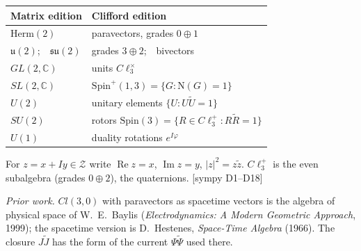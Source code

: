 \documentclass[10pt]{article}
\newcommand{\Cp}{\mathbb{C}}
\newcommand{\Cl}{C\ell_3}
\newcommand{\rv}[1]{\widetilde{#1}}
\newcommand{\N}{\mathrm N}
\newcommand{\Zc}{\mathcal Z}
\newcommand{\Spin}{\mathrm{Spin}}
\newcommand{\tg}[1]{{\scriptsize[#1]}}
\begin{document}
\begin{sheetbox}
{\begin{minipage}[t]{0.46\linewidth}
\begin{tabular}[t]{@{}l l@{}}
\toprule
\textbf{Matrix edition} & \textbf{Clifford edition}\\
\midrule
$\mathrm{Herm}(2)$ & paravectors, grades $0\oplus1$\\
$\mathfrak u(2)$;\ \ $\mathfrak{su}(2)$ & grades $3\oplus2$;\ \ bivectors\\
$GL(2,\Cp)$ & units $\Cl^\times$\\
$SL(2,\Cp)$ & $\Spin^+(1,3)=\{G:\N(G)=1\}$\\
$U(2)$ & unitary elements $\{U:U\rv U=1\}$\\
$SU(2)$ & rotors $\Spin(3)=\{R\in\Cl^+:R\rv R=1\}$\\
$U(1)$ & duality rotations $e^{I\varphi}$\\
\bottomrule
\end{tabular}
\end{minipage}}\par\vspace{3pt}
For $z=x+Iy\in\Zc$ write $\operatorname{Re}z=x$, $\operatorname{Im}z=y$, $|z|^2=z\rv z$. $\Cl^+$ is the even subalgebra (grades $0\oplus2$), the quaternions. \tg{sympy D1--D18}\par\vspace{2pt}
{\footnotesize\textit{Prior work.} $Cl(3,0)$ with paravectors as spacetime vectors is the algebra of physical space of W.~E.~Baylis (\textit{Electrodynamics: A Modern Geometric Approach}, 1999); the spacetime version is D.~Hestenes, \textit{Space-Time Algebra} (1966). The closure $J\rv J$ has the form of the current $\Psi\rv\Psi$ used there.}
\end{sheetbox}
\end{document}
